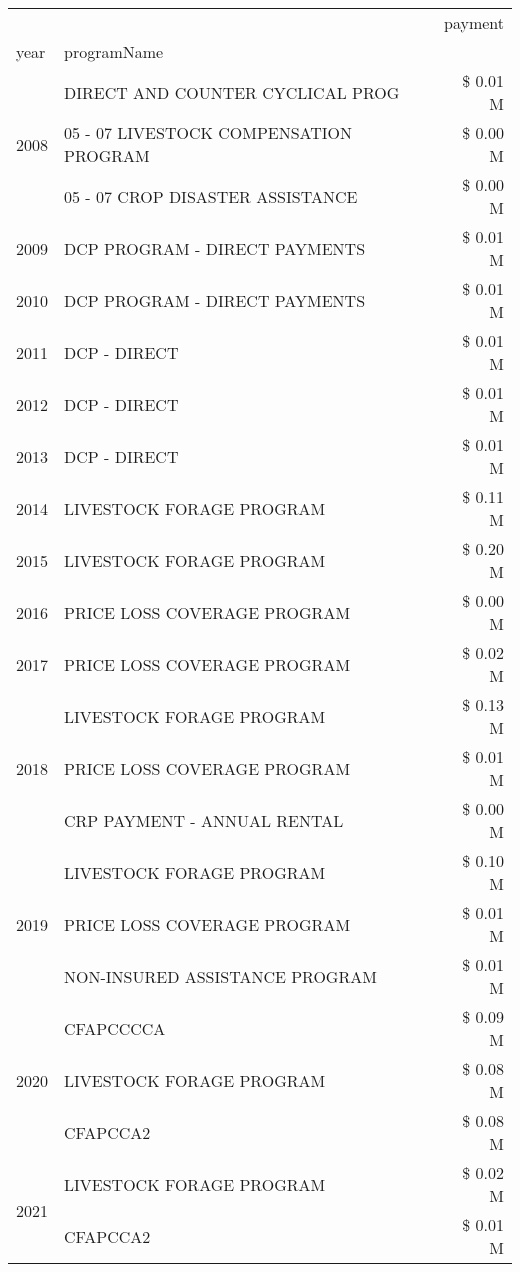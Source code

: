 \begin{tabular}{llr}
\toprule
 &  & payment \\
year & programName &  \\
\midrule
\multirow[t]{3}{*}{2008} & DIRECT AND COUNTER CYCLICAL PROG & \$ 0.01 M \\
 & 05 - 07 LIVESTOCK COMPENSATION PROGRAM & \$ 0.00 M \\
 & 05 - 07 CROP DISASTER ASSISTANCE & \$ 0.00 M \\
\cline{1-3}
2009 & DCP PROGRAM - DIRECT PAYMENTS & \$ 0.01 M \\
\cline{1-3}
2010 & DCP PROGRAM - DIRECT PAYMENTS & \$ 0.01 M \\
\cline{1-3}
2011 & DCP - DIRECT & \$ 0.01 M \\
\cline{1-3}
2012 & DCP - DIRECT & \$ 0.01 M \\
\cline{1-3}
2013 & DCP - DIRECT & \$ 0.01 M \\
\cline{1-3}
2014 & LIVESTOCK FORAGE PROGRAM & \$ 0.11 M \\
\cline{1-3}
2015 & LIVESTOCK FORAGE PROGRAM & \$ 0.20 M \\
\cline{1-3}
2016 & PRICE LOSS COVERAGE PROGRAM                   & \$ 0.00 M \\
\cline{1-3}
2017 & PRICE LOSS COVERAGE PROGRAM & \$ 0.02 M \\
\cline{1-3}
\multirow[t]{3}{*}{2018} & LIVESTOCK FORAGE PROGRAM & \$ 0.13 M \\
 & PRICE LOSS COVERAGE PROGRAM & \$ 0.01 M \\
 & CRP PAYMENT - ANNUAL RENTAL & \$ 0.00 M \\
\cline{1-3}
\multirow[t]{3}{*}{2019} & LIVESTOCK FORAGE PROGRAM & \$ 0.10 M \\
 & PRICE LOSS COVERAGE PROGRAM & \$ 0.01 M \\
 & NON-INSURED ASSISTANCE PROGRAM & \$ 0.01 M \\
\cline{1-3}
\multirow[t]{3}{*}{2020} & CFAPCCCCA & \$ 0.09 M \\
 & LIVESTOCK FORAGE PROGRAM & \$ 0.08 M \\
 & CFAPCCA2 & \$ 0.08 M \\
\cline{1-3}
\multirow[t]{2}{*}{2021} & LIVESTOCK FORAGE PROGRAM & \$ 0.02 M \\
 & CFAPCCA2 & \$ 0.01 M \\
\cline{1-3}
\bottomrule
\end{tabular}
